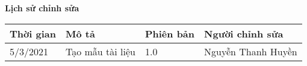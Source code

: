 \documentclass[./main.tex]{subfiles}
\begin{document}
	\begin{center}
		\Large{\textbf{Lịch sử chỉnh sửa}}
		\begin{table}[H]
			\begin{tabular}{|l|l|l|l|}
				\hline
				\textbf{Thời gian} & \textbf{Mô tả}   & \textbf{Phiên bản} & \textbf{Người chỉnh sửa}                                                 \\ \hline
				5/3/2021  & Tạo mẫu tài liệu             & 1.0 & Nguyễn Thanh Huyền \\ \hline
				
				
			\end{tabular}
		\end{table}
	\end{center}
	
\end{document}
